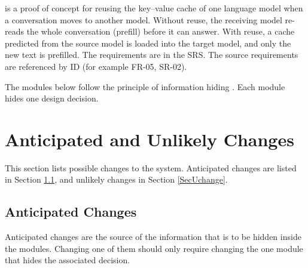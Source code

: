 \documentclass[12pt, titlepage]{article}
\begin{document}
\progname{} is a proof of concept for reusing the key--value cache of one
language model when a conversation moves to another model. Without reuse, the
receiving model re-reads the whole conversation (prefill) before it can answer.
With reuse, a cache predicted from the source model is loaded into the target
model, and only the new text is prefilled. The requirements are in the SRS.
The source requirements are referenced by ID (for example FR-05, SR-02).

The modules below follow the principle of information hiding
\citep{ParnasEtAl1984}. Each module hides one design decision.

\section{Anticipated and Unlikely Changes} \label{SecChange}

This section lists possible changes to the system. Anticipated changes are
listed in Section \ref{SecAchange}, and unlikely changes in Section \ref{SecUchange}.

\subsection{Anticipated Changes} \label{SecAchange}

Anticipated changes are the source of the information that is to be hidden
inside the modules. Changing one of them should only require changing the one
module that hides the associated decision.
\end{document}
